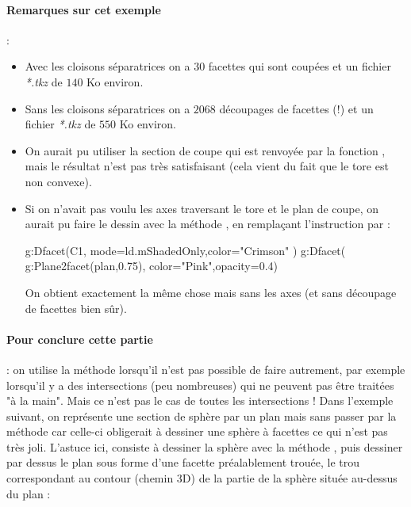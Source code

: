 \paragraph{Remarques sur cet exemple} : 
\begin{itemize}
    \item Avec les cloisons séparatrices on a $30$ facettes qui sont coupées et un fichier \emph{*.tkz} de $140$ Ko environ.
    \item Sans les cloisons séparatrices on a $2068$ découpages de facettes (!) et un fichier \emph{*.tkz} de $550$ Ko environ.
    \item On aurait pu utiliser la section de coupe qui est renvoyée par la fonction , mais le résultat n'est pas très satisfaisant (cela vient du fait que le tore est non convexe).
    \item Si on n'avait pas voulu les axes traversant le tore et le plan de coupe, on aurait pu faire le dessin avec la méthode , en remplaçant l'instruction  par :
    
\begin{Luacode}
g:Dfacet(C1, {mode=ld.mShadedOnly,color="Crimson"} )
g:Dfacet( g:Plane2facet(plan,0.75), {color="Pink",opacity=0.4}) 
\end{Luacode}
On obtient exactement la même chose mais sans les axes (et sans découpage de facettes bien sûr).
\end{itemize}

\paragraph{Pour conclure cette partie} : on utilise la méthode  lorsqu'il n'est pas possible de faire autrement, par exemple lorsqu'il y a des intersections (peu nombreuses) qui ne peuvent pas être traitées "à la main". Mais ce n'est pas le cas de toutes les intersections ! Dans l'exemple suivant, on représente une section de sphère par un plan mais sans passer par la méthode  car celle-ci obligerait à dessiner une sphère à facettes ce qui n'est pas très joli. L'astuce ici, consiste à dessiner la sphère avec la méthode , puis dessiner par dessus le plan sous forme d'une facette préalablement trouée, le trou correspondant au contour (chemin 3D) de la partie de la sphère située au-dessus du plan :

